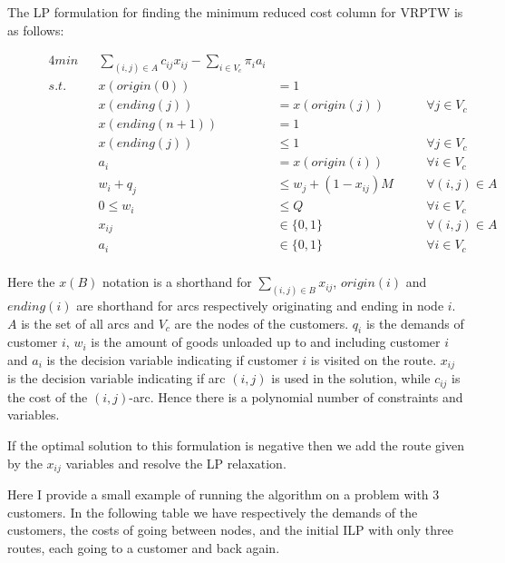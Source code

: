 The LP formulation for finding the minimum reduced cost column for VRPTW is as follows:

\begin{figure}[H]
\begin{alignat}{4}
min     && \sum_{(i,j) \in A} c_{ij} x_{ij} - \sum_{i \in V_c} \pi_i a_i \\
s.t.    && x(origin(0))      & = 1 \\
        && x(ending(j))      & = x(origin(j))               && \forall j \in V_c \\
        && x(ending(n+1))    & = 1 \\
        && x(ending(j))      & \leq 1                       && \forall j \in V_c \\
        && a_i               & = x(origin(i))               && \forall i \in V_c \\
        && w_i + q_j         & \leq w_j + (1-x_{ij})M \quad && \forall (i,j) \in A \\
        && 0 \leq w_i        & \leq Q                       && \forall i \in V_c \\
        && x_{ij}            & \in \{0,1\}                  && \forall (i,j) \in A \\
        && a_{i}             & \in \{0,1\}                  && \forall i \in V_c \\
\end{alignat}
\end{figure}
Here the $x(B)$ notation is a shorthand for $\sum_{(i,j) \in B} x_{ij}$, $origin(i)$ and $ending(i)$ are shorthand for arcs respectively originating and ending in node $i$. $A$ is the set of all arcs and $V_c$ are the nodes of the customers. $q_i$ is the demands of customer $i$, $w_i$ is the amount of goods unloaded up to and including customer $i$ and $a_i$ is the decision variable indicating if customer $i$ is visited on the route. $x_{ij}$ is the decision variable indicating if arc $(i,j)$ is used in the solution, while $c_{ij}$ is the cost of the $(i,j)$-arc. Hence there is a polynomial number of constraints and variables. 

If the optimal solution to this formulation is negative then we add the route given by the $x_{ij}$ variables and resolve the LP relaxation.

\newpar Here I provide a small example of running the algorithm on a problem with 3 customers. In the following table we have respectively the demands of the customers, the costs of going between nodes, and the initial ILP with only three routes, each going to a customer and back again.

